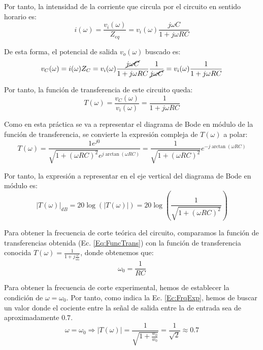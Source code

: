 Por tanto, la intensidad de la corriente que circula por el circuito en sentido horario es:
\begin{equation}
    i(\omega) = \frac{v_i(\omega)}{Z_{eq}}=v_i(\omega) \frac{j \omega C}{1+j\omega RC}
\end{equation}

De esta forma, el potencial de salida $v_o(\omega)$ buscado es:
\begin{equation}
    v_C (\omega) = i(\omega)Z_C = v_i(\omega) \frac{\cancel{j \omega C}}{1+j\omega RC}\frac{1}{\cancel{j\omega C}}=v_i(\omega) \frac{1}{1+j\omega RC}
\end{equation}

Por tanto, la función de transferencia de este circuito queda:
\begin{equation} \label{Eq:FuncTrans}
    T(\omega) =  \frac{v_C(\omega)}{v_i(\omega)} = \frac{1}{1+j\omega RC}
\end{equation}

Como en esta práctica se va a representar el diagrama de Bode en módulo de la función de transferencia, se convierte la expresión compleja de $T(\omega)$ a polar:
\begin{equation}
    T(\omega) = \frac{1e^{j0}}{\sqrt{1 + (\omega RC)^2}e^{j\arctan(\omega RC)}} = \frac{1}{\sqrt{1 + (\omega RC)^2}} e^{-j\arctan(\omega RC)}
\end{equation}

Por tanto, la expresión a representar en el eje vertical del diagrama de Bode en módulo es:
\begin{equation}
    |T(\omega)|_{dB} = 20\log(|T(\omega)|) = 20\log\left( \frac{1}{\sqrt{1 + (\omega RC)^2}} \right)
\end{equation}

Para obtener la frecuencia de corte teórica del circuito, comparamos la función de transferencias obtenida (Ec. \ref{Eq:FuncTrans}) con la función de transferencia conocida $T(\omega) = \frac{1}{1+j\frac{\omega}{\omega_0}}$, donde obtenemos que:
\begin{equation}\label{Ec:FrqTeo}
    \omega_0 = \frac{1}{RC}
\end{equation}

Para obtener la frecuencia de corte experimental, hemos de establecer la condición de $\omega = \omega_0$. Por tanto, como indica la Ec. \ref{Ec:FrqExp}, hemos de buscar un valor donde el cociente entre la señal de salida entre la de entrada sea de aproximadamente $0.7$.
\begin{equation}\label{Ec:FrqExp}
    \omega = \omega_0 \Longrightarrow |T(\omega)|=\frac{1}{\sqrt{1+\frac{w_0}{w_0}}} = \frac{1}{\sqrt{2}}\approx 0.7
\end{equation}

